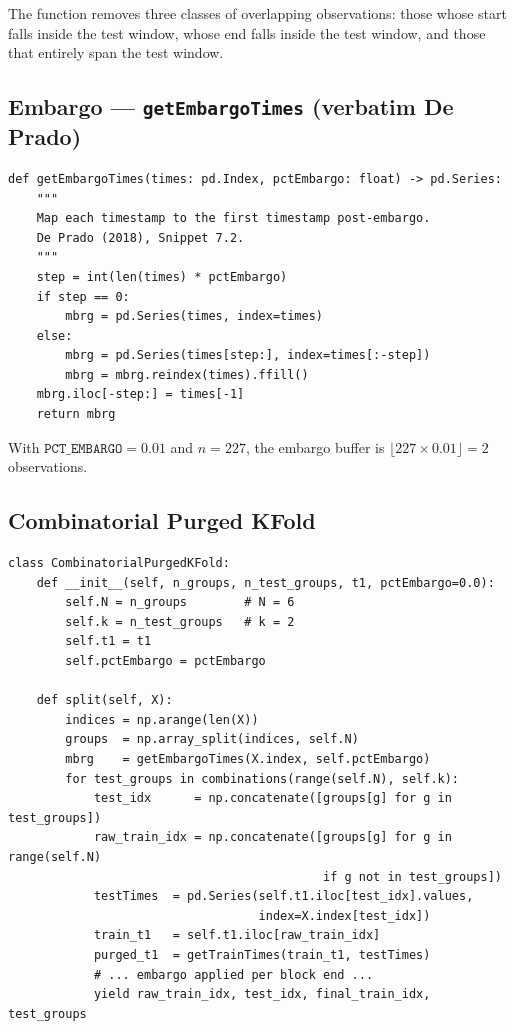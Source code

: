 \documentclass[11pt,a4paper]{article}
\begin{document}
The function removes three classes of overlapping observations: those whose
start falls inside the test window, whose end falls inside the test window, and
those that entirely span the test window.

\subsection{Embargo --- \texttt{getEmbargoTimes} (verbatim De Prado)}

\begin{lstlisting}
def getEmbargoTimes(times: pd.Index, pctEmbargo: float) -> pd.Series:
    """
    Map each timestamp to the first timestamp post-embargo.
    De Prado (2018), Snippet 7.2.
    """
    step = int(len(times) * pctEmbargo)
    if step == 0:
        mbrg = pd.Series(times, index=times)
    else:
        mbrg = pd.Series(times[step:], index=times[:-step])
        mbrg = mbrg.reindex(times).ffill()
    mbrg.iloc[-step:] = times[-1]
    return mbrg
\end{lstlisting}

With $\texttt{PCT\_EMBARGO} = 0.01$ and $n=227$, the embargo buffer is
$\lfloor 227 \times 0.01 \rfloor = 2$ observations.

\subsection{Combinatorial Purged KFold}

\begin{lstlisting}
class CombinatorialPurgedKFold:
    def __init__(self, n_groups, n_test_groups, t1, pctEmbargo=0.0):
        self.N = n_groups        # N = 6
        self.k = n_test_groups   # k = 2
        self.t1 = t1
        self.pctEmbargo = pctEmbargo

    def split(self, X):
        indices = np.arange(len(X))
        groups  = np.array_split(indices, self.N)
        mbrg    = getEmbargoTimes(X.index, self.pctEmbargo)
        for test_groups in combinations(range(self.N), self.k):
            test_idx      = np.concatenate([groups[g] for g in test_groups])
            raw_train_idx = np.concatenate([groups[g] for g in range(self.N)
                                            if g not in test_groups])
            testTimes  = pd.Series(self.t1.iloc[test_idx].values,
                                   index=X.index[test_idx])
            train_t1   = self.t1.iloc[raw_train_idx]
            purged_t1  = getTrainTimes(train_t1, testTimes)
            # ... embargo applied per block end ...
            yield raw_train_idx, test_idx, final_train_idx, test_groups
\end{lstlisting}
\end{document}
